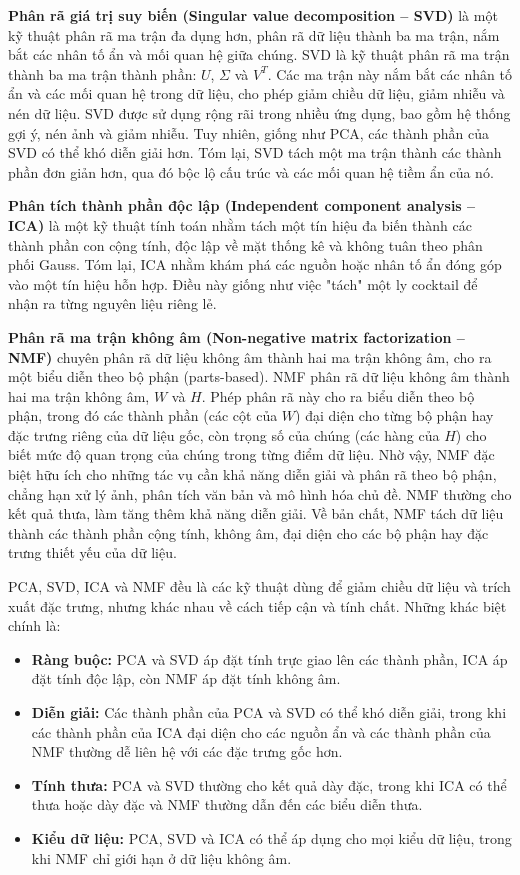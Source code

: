 \textbf{Phân rã giá trị suy biến (Singular value decomposition -- SVD)} là một kỹ thuật phân rã ma trận đa dụng hơn, phân rã dữ liệu thành ba ma trận, nắm bắt các nhân tố ẩn và mối quan hệ giữa chúng. SVD là kỹ thuật phân rã ma trận thành ba ma trận thành phần: \(U\), \(\Sigma\) và \(V^T\). Các ma trận này nắm bắt các nhân tố ẩn và các mối quan hệ trong dữ liệu, cho phép giảm chiều dữ liệu, giảm nhiễu và nén dữ liệu. SVD được sử dụng rộng rãi trong nhiều ứng dụng, bao gồm hệ thống gợi ý, nén ảnh và giảm nhiễu. Tuy nhiên, giống như PCA, các thành phần của SVD có thể khó diễn giải hơn. Tóm lại, SVD tách một ma trận thành các thành phần đơn giản hơn, qua đó bộc lộ cấu trúc và các mối quan hệ tiềm ẩn của nó.

\textbf{Phân tích thành phần độc lập (Independent component analysis -- ICA)} là một kỹ thuật tính toán nhằm tách một tín hiệu đa biến thành các thành phần con cộng tính, độc lập về mặt thống kê và không tuân theo phân phối Gauss. Tóm lại, ICA nhằm khám phá các nguồn hoặc nhân tố ẩn đóng góp vào một tín hiệu hỗn hợp. Điều này giống như việc "tách" một ly cocktail để nhận ra từng nguyên liệu riêng lẻ.

\textbf{Phân rã ma trận không âm (Non-negative matrix factorization -- NMF)} chuyên phân rã dữ liệu không âm thành hai ma trận không âm, cho ra một biểu diễn theo bộ phận (parts-based). NMF phân rã dữ liệu không âm thành hai ma trận không âm, \(W\) và \(H\). Phép phân rã này cho ra biểu diễn theo bộ phận, trong đó các thành phần (các cột của \(W\)) đại diện cho từng bộ phận hay đặc trưng riêng của dữ liệu gốc, còn trọng số của chúng (các hàng của \(H\)) cho biết mức độ quan trọng của chúng trong từng điểm dữ liệu. Nhờ vậy, NMF đặc biệt hữu ích cho những tác vụ cần khả năng diễn giải và phân rã theo bộ phận, chẳng hạn xử lý ảnh, phân tích văn bản và mô hình hóa chủ đề. NMF thường cho kết quả thưa, làm tăng thêm khả năng diễn giải. Về bản chất, NMF tách dữ liệu thành các thành phần cộng tính, không âm, đại diện cho các bộ phận hay đặc trưng thiết yếu của dữ liệu.

PCA, SVD, ICA và NMF đều là các kỹ thuật dùng để giảm chiều dữ liệu và trích xuất đặc trưng, nhưng khác nhau về cách tiếp cận và tính chất. Những khác biệt chính là:

\begin{itemize}
\item
  \textbf{Ràng buộc:} PCA và SVD áp đặt tính trực giao lên các thành phần, ICA áp đặt tính độc lập, còn NMF áp đặt tính không âm.
\item
  \textbf{Diễn giải:} Các thành phần của PCA và SVD có thể khó diễn giải, trong khi các thành phần của ICA đại diện cho các nguồn ẩn và các thành phần của NMF thường dễ liên hệ với các đặc trưng gốc hơn.
\item
  \textbf{Tính thưa:} PCA và SVD thường cho kết quả dày đặc, trong khi ICA có thể thưa hoặc dày đặc và NMF thường dẫn đến các biểu diễn thưa.
\item
  \textbf{Kiểu dữ liệu:} PCA, SVD và ICA có thể áp dụng cho mọi kiểu dữ liệu, trong khi NMF chỉ giới hạn ở dữ liệu không âm.
\end{itemize}

